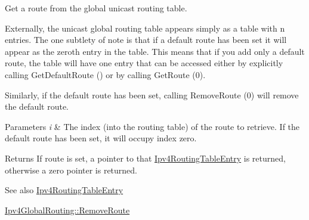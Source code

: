 Get a route from the global unicast routing table. 

Externally, the unicast global routing table appears simply as a table with n entries. The one subtlety of note is that if a default route has been set it will appear as the zeroth entry in the table. This means that if you add only a default route, the table will have one entry that can be accessed either by explicitly calling Get\+Default\+Route () or by calling Get\+Route (0).

Similarly, if the default route has been set, calling Remove\+Route (0) will remove the default route.


\begin{DoxyParams}{Parameters}
{\em i} & The index (into the routing table) of the route to retrieve. If the default route has been set, it will occupy index zero. \\
\hline
\end{DoxyParams}
\begin{DoxyReturn}{Returns}
If route is set, a pointer to that \hyperlink{classns3_1_1Ipv4RoutingTableEntry}{Ipv4\+Routing\+Table\+Entry} is returned, otherwise a zero pointer is returned.
\end{DoxyReturn}
\begin{DoxySeeAlso}{See also}
\hyperlink{classns3_1_1Ipv4RoutingTableEntry}{Ipv4\+Routing\+Table\+Entry} 

\hyperlink{classns3_1_1Ipv4GlobalRouting_a406d6a56f246ef9c105a6ad5da4d7ffb}{Ipv4\+Global\+Routing\+::\+Remove\+Route} 
\end{DoxySeeAlso}

